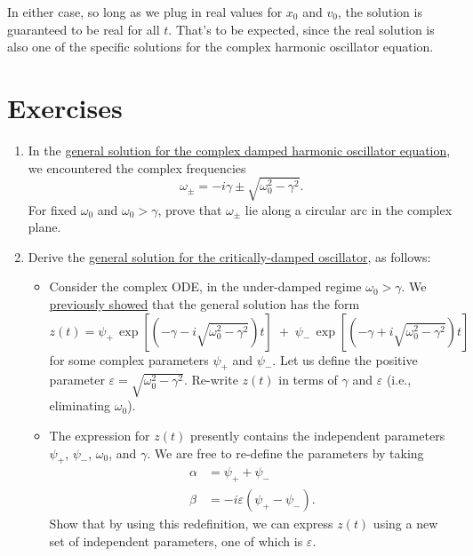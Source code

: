 \documentclass[10pt,a4paper]{article}
\begin{document}
In either case, so long as we plug in real values for $x_0$ and $v_0$,
the solution is guaranteed to be real for all $t$. That's to be
expected, since the real solution is also one of the specific
solutions for the complex harmonic oscillator equation.

\section{Exercises}\label{exercises}

\begin{enumerate}
\item
In the \hyperref[general-solution]{general solution for the complex
  damped harmonic oscillator equation}, we encountered the complex
frequencies
\begin{equation}
\omega_\pm = -i\gamma \pm \sqrt{\omega_0^2 - \gamma^2}.
\end{equation}For
fixed $\omega_0$ and $\omega_0 > \gamma$, prove that $\omega_\pm$ lie
along a circular arc in the complex plane.

\item
Derive the \hyperref[critical-damping]{general solution for the
  critically-damped oscillator}, as follows:

\begin{itemize}
\item Consider the complex ODE, in the under-damped regime $\omega_0 >
  \gamma$. We \hyperref[general-solution]{previously showed} that the
  general solution has the form
\begin{equation*}
z(t) = \psi_+ \, \exp\left[\left(-\gamma  - i \sqrt{\omega_0^2 - \gamma^2}\right)t\right] \; +\; \psi_- \, \exp\left[\left(-\gamma +i\sqrt{\omega_0^2 - \gamma^2}\right)t\right]
\end{equation*}
for some complex parameters $\psi_+$ and $\psi_-$. Let us define the
positive parameter $\varepsilon = \sqrt{\omega_0^2 - \gamma^2}$.
Re-write $z(t)$ in terms of $\gamma$ and $\varepsilon$ (i.e.,
eliminating $\omega_0$).

\item
The expression for $z(t)$ presently contains the independent
parameters $\psi_+$, $\psi_-$, $\omega_0$, and $\gamma$. We are free
to re-define the parameters by taking
\begin{align}
  \alpha &= \psi_+ + \psi_- \\ \beta &= -i\varepsilon(\psi_+ - \psi_-).
\end{align}
Show that by using this redefinition, we can express $z(t)$ using a
new set of independent parameters, one of which is $\varepsilon$.


\end{itemize}
\end{enumerate}
\end{document}
